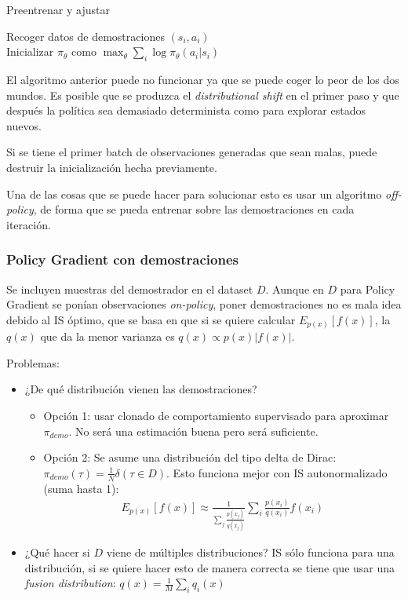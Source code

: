 \begin{algorithm}
    \caption{Preentrenar y ajustar}
    Recoger datos de demostraciones $(s_i,a_i)$ \\
    Inicializar $\pi_\theta$ como
    $\max_\theta\sum_i\log\pi_\theta(a_i|s_i)$ \\
\end{algorithm}

El algoritmo anterior puede no funcionar ya que se puede coger lo peor de los dos mundos. Es
posible que se produzca el \textit{distributional shift} en el primer paso y que después la
política sea demasiado determinista como para explorar estados nuevos.

Si se tiene el primer batch de observaciones generadas que sean malas, puede destruir la
inicialización hecha previamente.

Una de las cosas que se puede hacer para solucionar esto es usar un algoritmo
\textit{off-policy}, de forma que se pueda entrenar sobre las demostraciones en cada
iteración.

\subsubsection{Policy Gradient con demostraciones}%
\label{ssub:policy_gradient_con_demostraciones}

Se incluyen muestras del demostrador en el dataset $D$. Aunque en $D$ para Policy Gradient se
ponían observaciones \textit{on-policy}, poner demostraciones no es mala idea debido al IS
óptimo, que se basa en que si se quiere calcular $E_{p(x)}[f(x)]$, la $q(x)$ que da la menor
varianza es $q(x)\propto p(x)|f(x)|$. 

Problemas:
\begin{itemize}
    \item ¿De qué distribución vienen las demostraciones?
        \begin{itemize}
            \item Opción 1: usar clonado de comportamiento supervisado para aproximar
                $\pi_{demo}$. No será una estimación buena pero será suficiente.
            \item Opción 2: Se asume una distribución del tipo delta de Dirac:
                $\pi_{demo}(\tau)= \frac{1}{N} \delta (\tau\in D)$.  Esto funciona mejor con
                IS autonormalizado (suma hasta 1): 
                \begin{align}
                    E_{p(x)}[f(x)]\approx \frac{1}{\sum_j \frac{p(x_j)}{q(x_j)} }
                    \sum_i \frac{p(x_i)}{q(x_i)} f(x_i)
                \end{align}
        \end{itemize}
    \item ¿Qué hacer si $D$ viene de múltiples distribuciones? IS sólo funciona para una
        distribución, si se quiere hacer esto de manera correcta se tiene que usar una
        \textit{fusion distribution}: $q(x)= \frac{1}{M} \sum_i q_i(x)$
\end{itemize}


